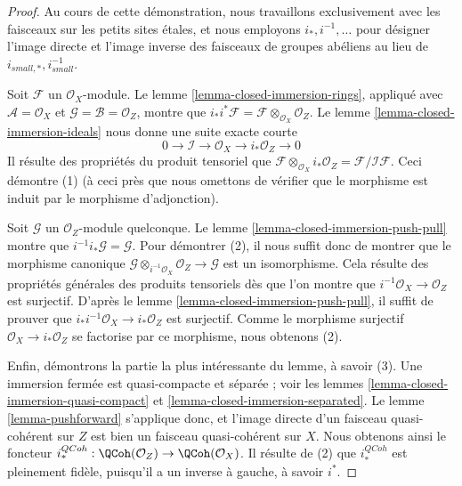\begin{proof}
Au cours de cette démonstration, nous travaillons exclusivement avec les faisceaux sur
les petits sites étales, et nous employons $i_*, i^{-1}, \ldots$
pour désigner l'image directe et l'image inverse des faisceaux de groupes abéliens
au lieu de $i_{small, *}, i_{small}^{-1}$.

\medskip\noindent
Soit $\mathcal{F}$ un $\mathcal{O}_X$-module. Le
lemme \ref{lemma-closed-immersion-rings}, appliqué avec
$\mathcal{A} = \mathcal{O}_X$ et
$\mathcal{G} = \mathcal{B} = \mathcal{O}_Z$, montre que
$i_*i^*\mathcal{F} = \mathcal{F} \otimes_{\mathcal{O}_X} \mathcal{O}_Z$.
Le
lemme \ref{lemma-closed-immersion-ideals}
nous donne une suite exacte courte
$$
0 \to \mathcal{I} \to \mathcal{O}_X \to i_*\mathcal{O}_Z \to 0
$$
Il résulte des propriétés du produit tensoriel que
$\mathcal{F} \otimes_{\mathcal{O}_X} i_*\mathcal{O}_Z
= \mathcal{F}/\mathcal{I}\mathcal{F}$. Ceci démontre (1) (à ceci près
que nous omettons de vérifier que le morphisme est induit par le
morphisme d'adjonction).

\medskip\noindent
Soit $\mathcal{G}$ un $\mathcal{O}_Z$-module quelconque. Le
lemme \ref{lemma-closed-immersion-push-pull}
montre que $i^{-1}i_*\mathcal{G} = \mathcal{G}$.
Pour démontrer (2), il nous suffit donc de montrer que le morphisme canonique
$\mathcal{G} \otimes_{i^{-1}\mathcal{O}_X} \mathcal{O}_Z \to \mathcal{G}$
est un isomorphisme. Cela résulte des propriétés générales des produits tensoriels
dès que l'on montre que $i^{-1}\mathcal{O}_X \to \mathcal{O}_Z$ est surjectif. D'après le
lemme \ref{lemma-closed-immersion-push-pull},
il suffit de prouver que
$i_*i^{-1}\mathcal{O}_X \to i_*\mathcal{O}_Z$
est surjectif. Comme le morphisme surjectif $\mathcal{O}_X \to i_*\mathcal{O}_Z$
se factorise par ce morphisme, nous obtenons (2).

\medskip\noindent
Enfin, démontrons la partie la plus intéressante du lemme, à savoir (3).
Une immersion fermée est quasi-compacte et séparée ; voir les
lemmes \ref{lemma-closed-immersion-quasi-compact} et
\ref{lemma-closed-immersion-separated}. Le
lemme \ref{lemma-pushforward}
s'applique donc, et l'image directe d'un faisceau quasi-cohérent
sur $Z$ est bien un faisceau quasi-cohérent sur $X$.
Nous obtenons ainsi le foncteur
$i^{QCoh}_* : \QCoh(\mathcal{O}_Z)
\to \QCoh(\mathcal{O}_X)$.
Il résulte de (2) que $i^{QCoh}_*$ est pleinement fidèle, puisqu'il
a un inverse à gauche, à savoir $i^*$.


\end{proof}
